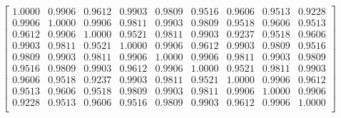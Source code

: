 \documentclass{article}
\begin{document}
\begin{equation}
\label{cov.empirical}
\begin{bmatrix}
1.0000  &  0.9906  &  0.9612  &  0.9903  &  0.9809  &  0.9516  &  0.9606  &  0.9513  &  0.9228\\
    0.9906  &  1.0000 &   0.9906  &  0.9811  &  0.9903  &  0.9809  &  0.9518  &  0.9606  &  0.9513 \\
    0.9612  &   0.9906  &   1.0000& 0.9521 &    0.9811 &    0.9903  &   0.9237  &   0.9518 &    0.9606 \\
    0.9903 &    0.9811 &    0.9521  &   1.0000  &   0.9906  &   0.9612  &   0.9903  &   0.9809  &   0.9516 \\
    0.9809  &   0.9903  &   0.9811  &   0.9906  &   1.0000  &   0.9906 &    0.9811  &   0.9903  &   0.9809 \\
    0.9516  &   0.9809 &    0.9903 &   0.9612  &   0.9906 &    1.0000 &    0.9521  &   0.9811&     0.9903 \\
    0.9606  &   0.9518  &   0.9237  &   0.9903  &   0.9811 &    0.9521 &   1.0000  &   0.9906 &    0.9612 \\
    0.9513   &  0.9606  &   0.9518 &    0.9809 &    0.9903  &   0.9811  &   0.9906  &   1.0000   &  0.9906 \\
    0.9228  &   0.9513 &    0.9606  &   0.9516  &   0.9809  &   0.9903  &   0.9612  &   0.9906  &   1.0000 \\
\end{bmatrix} 
\end{equation}
\end{document}
